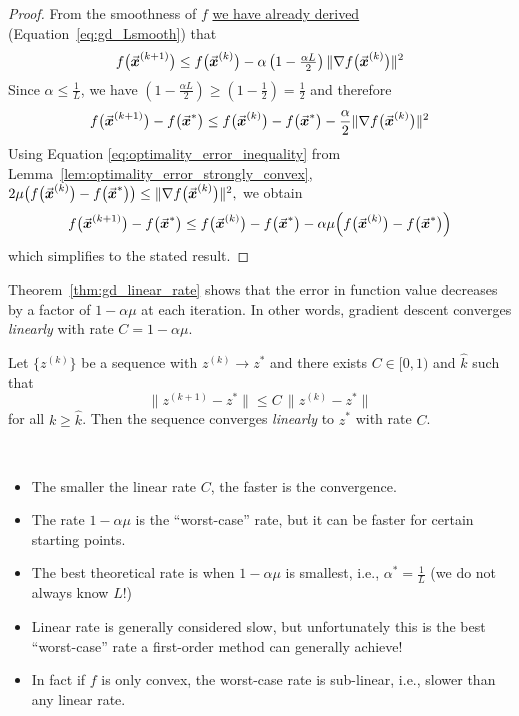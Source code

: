 \begin{proof}
From the smoothness of \(f\) \hyperref[eq:gd_Lsmooth]{we have already derived} (Equation~\ref{eq:gd_Lsmooth}) that
\[
f\bigl(\vec{\boldsymbol{x}}^{(k+1)}\bigr)\le f\bigl(\vec{\boldsymbol{x}}^{(k)}\bigr)
-\alpha\left(1-\tfrac{\alpha L}{2}\right)\|\nabla f\bigl(\vec{\boldsymbol{x}}^{(k)}\bigr)\|^{2}
\]
Since \(\alpha \le \frac{1}{L}\), we have \(\left(1-\frac{\alpha L}{2}\right)\ge\left(1-\frac{1}{2}\right)=\frac{1}{2}\) and therefore
\[
f\bigl(\vec{\boldsymbol{x}}^{(k+1)}\bigr)-f\bigl(\vec{\boldsymbol{x}}^{*}\bigr)
\le f\bigl(\vec{\boldsymbol{x}}^{(k)}\bigr)-f\bigl(\vec{\boldsymbol{x}}^{*}\bigr)
-\frac{\alpha}{2}\|\nabla f\bigl(\vec{\boldsymbol{x}}^{(k)}\bigr)\|^{2}
\]
Using Equation \eqref{eq:optimality_error_inequality} from Lemma~\ref{lem:optimality_error_strongly_convex},
\(
2\mu\bigl(f\bigl(\vec{\boldsymbol{x}}^{(k)}\bigr)-f\bigl(\vec{\boldsymbol{x}}^{*}\bigr)\bigr)
\le\|\nabla f\bigl(\vec{\boldsymbol{x}}^{(k)}\bigr)\|^{2},
\)
we obtain
\[
f\bigl(\vec{\boldsymbol{x}}^{(k+1)}\bigr)-f\bigl(\vec{\boldsymbol{x}}^{*}\bigr)
\le f\bigl(\vec{\boldsymbol{x}}^{(k)}\bigr)-f\bigl(\vec{\boldsymbol{x}}^{*}\bigr)
-\alpha\mu\Bigl(f\bigl(\vec{\boldsymbol{x}}^{(k)}\bigr)-f\bigl(\vec{\boldsymbol{x}}^{*}\bigr)\Bigr)
\]
which simplifies to the stated result.
\end{proof}

Theorem~\ref{thm:gd_linear_rate} shows that the error in function value decreases by a factor of \(1-\alpha\mu\) at each iteration. In other words, gradient descent converges \emph{linearly} with rate \(C=1-\alpha\mu\).

\begin{definition}
Let \(\{z^{(k)}\}\) be a sequence with \(z^{(k)} \to z^*\) and there exists \(C \in [0,1)\) and \(\hat{k}\) such that
\[
\|z^{(k+1)}-z^{*}\|\le C\,\|z^{(k)}-z^{*}\|%
\]
for all \(k\ge \hat{k}\). Then the sequence converges \emph{linearly} to \(z^*\) with rate \(C\).
\end{definition}


\begin{remark}\
\begin{itemize}
\item The smaller the linear rate \(C\), the faster is the convergence.
\item The rate \(1-\alpha \mu\) is the ``worst-case'' rate, but it can be faster for certain starting points.
\item The best theoretical rate is when \(1-\alpha \mu\) is smallest, i.e., \(\alpha^{*}=\frac{1}{L}\) (we do not always know \(L\)!)
\item Linear rate is generally considered slow, but unfortunately this is the best ``worst-case'' rate a first-order method can generally achieve!
\item In fact if \(f\) is only convex, the worst-case rate is sub-linear, i.e., slower than any linear rate.
\end{itemize}
\end{remark}

